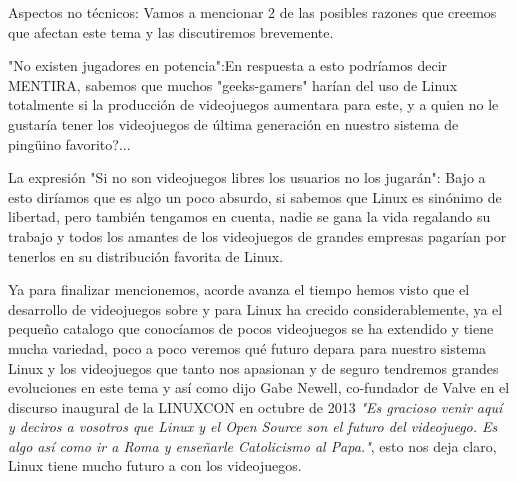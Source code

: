 Aspectos no técnicos:     Vamos a mencionar 2 de las posibles razones que creemos que afectan este tema y las discutiremos brevemente.

"No existen jugadores en potencia":En respuesta a esto podríamos decir MENTIRA, sabemos que muchos "geeks-gamers" harían del uso de Linux totalmente si la producción 
de videojuegos aumentara para este, y a quien no le gustaría tener los videojuegos de última generación en nuestro sistema de pingüino favorito?...

La expresión "Si no son videojuegos libres los usuarios no los jugarán": Bajo a esto diríamos que es algo un poco absurdo, si sabemos que Linux es sinónimo de libertad, 
pero también tengamos en cuenta, nadie se gana la vida regalando su trabajo y todos los amantes de los  videojuegos de grandes empresas pagarían por tenerlos en su     
distribución favorita de Linux.

Ya para finalizar mencionemos, acorde avanza el tiempo hemos visto que el desarrollo de videojuegos sobre y para Linux ha crecido considerablemente, ya el pequeño catalogo 
que conocíamos de pocos videojuegos se ha extendido y tiene mucha variedad, poco a poco veremos qué futuro depara para nuestro sistema Linux y los videojuegos que tanto nos 
apasionan y de seguro tendremos grandes evoluciones en este tema y así como dijo Gabe Newell, co-fundador de Valve en el discurso inaugural de la LINUXCON en octubre de 
2013 \textit{"Es gracioso venir aquí y deciros a vosotros que Linux y el Open Source son el futuro del videojuego. Es algo así como ir a Roma y enseñarle Catolicismo al 
Papa."}, esto nos deja claro, Linux tiene mucho futuro a con los videojuegos.
